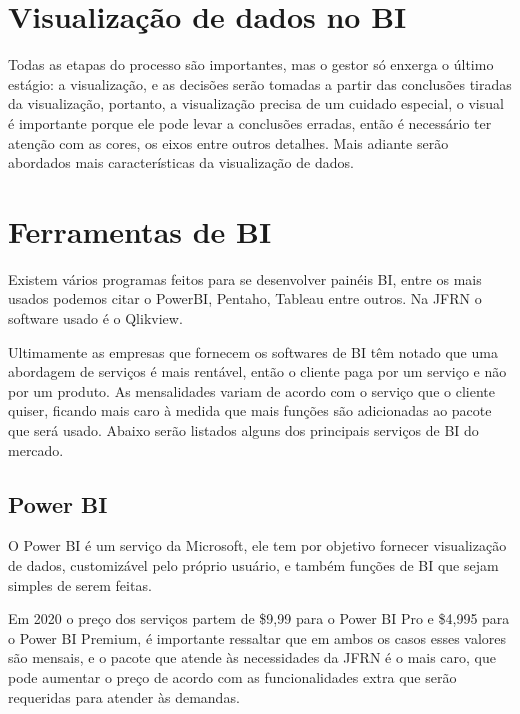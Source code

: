 \section{Visualização de dados no BI}

Todas as etapas do processo são importantes, mas o gestor só enxerga o último estágio: a visualização, e as decisões serão tomadas a partir das conclusões tiradas da visualização, portanto, a visualização precisa de um cuidado especial, o visual é importante porque ele pode levar a conclusões erradas, então é necessário ter atenção com as cores, os eixos entre outros detalhes. Mais adiante serão abordados mais características da visualização de dados.

\section{Ferramentas de BI}

Existem vários programas feitos para se desenvolver painéis BI, entre os mais usados podemos citar o PowerBI, Pentaho, Tableau entre outros. Na JFRN o software usado é o Qlikview. 

Ultimamente as empresas que fornecem os softwares de BI têm notado que uma abordagem de serviços é mais rentável, então o cliente paga por um serviço e não por um produto. As mensalidades variam de acordo com o serviço que o cliente quiser, ficando mais caro à medida que mais funções são adicionadas ao pacote que será usado. Abaixo serão listados alguns dos principais serviços de BI do mercado.

\subsection{Power BI}

O Power BI é um serviço da Microsoft, ele tem por objetivo fornecer visualização de dados, customizável pelo próprio usuário, e também funções de BI que sejam simples de serem feitas. 

Em 2020 o preço dos serviços partem de \$9,99 para o Power BI Pro e \$4,995 para o Power BI Premium, é importante ressaltar que em ambos os casos esses valores são mensais, e o pacote que atende às necessidades da JFRN é o mais caro, que pode aumentar o preço de acordo com as funcionalidades extra que serão requeridas para atender às demandas.

